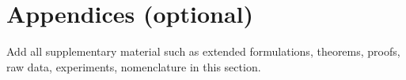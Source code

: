 \section*{Appendices (optional)}
    Add all supplementary material such as extended formulations, theorems, proofs, raw data, experiments, nomenclature in this section.